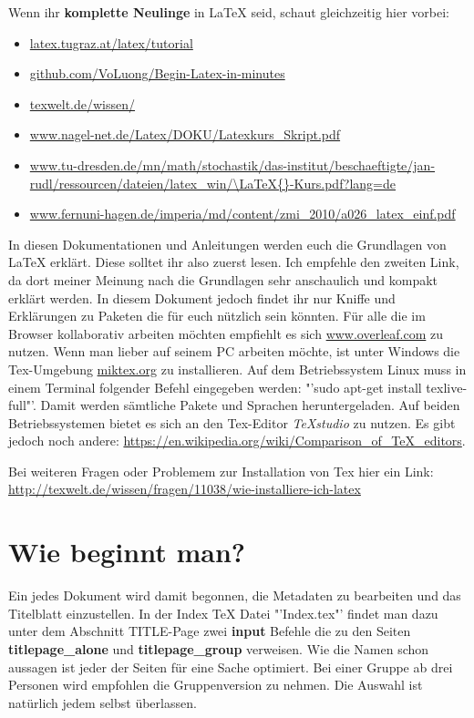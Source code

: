 Wenn ihr \textbf{komplette Neulinge} in \LaTeX{} seid, schaut gleichzeitig hier vorbei:
\begin{itemize}
	\item \url{latex.tugraz.at/latex/tutorial}
	\item \url{github.com/VoLuong/Begin-Latex-in-minutes}
	\item \url{texwelt.de/wissen/}
	\item \url{www.nagel-net.de/Latex/DOKU/Latexkurs_Skript.pdf}
	\item \url{www.tu-dresden.de/mn/math/stochastik/das-institut/beschaeftigte/jan-rudl/ressourcen/dateien/latex_win/\LaTeX{}-Kurs.pdf?lang=de}
	\item \url{www.fernuni-hagen.de/imperia/md/content/zmi_2010/a026_latex_einf.pdf}
\end{itemize} 
In diesen Dokumentationen und Anleitungen werden euch die Grundlagen von \LaTeX{} erklärt. Diese solltet ihr also zuerst lesen. Ich empfehle den zweiten Link, da dort meiner Meinung nach die Grundlagen sehr anschaulich und kompakt erklärt werden. In diesem Dokument jedoch findet ihr nur Kniffe und Erklärungen zu Paketen die für euch nützlich sein könnten.
Für alle die im Browser kollaborativ arbeiten möchten empfiehlt es sich \url{www.overleaf.com} zu nutzen. Wenn man lieber auf seinem PC arbeiten möchte, ist unter Windows die Tex-Umgebung \url{miktex.org} zu installieren. Auf dem Betriebssystem Linux muss in einem Terminal folgender Befehl eingegeben werden: "'sudo apt-get install texlive-full"'. Damit werden sämtliche Pakete und Sprachen heruntergeladen. Auf beiden Betriebssystemen bietet es sich an den Tex-Editor \emph{TeXstudio} zu nutzen. Es gibt jedoch noch andere: \url{https://en.wikipedia.org/wiki/Comparison_of_TeX_editors}.

Bei weiteren Fragen oder Problemem zur Installation von Tex hier ein Link:\\
\url{http://texwelt.de/wissen/fragen/11038/wie-installiere-ich-latex}

\section{Wie beginnt man?}

Ein jedes Dokument wird damit begonnen, die Metadaten zu bearbeiten und das Titelblatt einzustellen. In der Index TeX Datei "'Index.tex"' findet man dazu unter dem Abschnitt TITLE-Page zwei \textbf{input} Befehle die zu den Seiten \textbf{titlepage\_alone} und \textbf{titlepage\_group} verweisen. Wie die Namen schon aussagen ist jeder der Seiten für eine Sache optimiert. Bei einer Gruppe ab drei Personen wird empfohlen die Gruppenversion zu nehmen. Die Auswahl ist natürlich jedem selbst überlassen.\\

